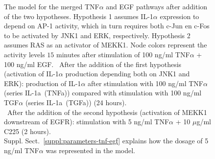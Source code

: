 \begin{figure}[!tpb]
\begin{center}
\end{center}
\caption{\scriptsize
{\bf \protect{}} The model for the merged TNF$\alpha$ and EGF pathways
after addition of the two hypotheses. 
Hypothesis 1 assumes IL-1$\alpha$ expression to depend on AP-1 activity, which in turn requires 
both c-Jun en c-Fos to be activated by JNK1 and ERK, respectively. Hypothesis 2 assumes RAS as an activator 
of MEKK1. Node colors represent the activity levels $15$ minutes
after stimulation of 100 ng/ml TNF$\alpha$ + 100 ng/ml EGF.
{\bf \protect{}}~After the addition of the first hypothesis (activation of IL-1$\alpha$ production depending both
on JNK1 and ERK): production of IL-1$\alpha$ after stimulation with 100 ng/ml TNF$\alpha$ (series {\sf IL-1a~(TNFa)})
compared with stimulation with 100 ng/ml TGF$\alpha$ (series {\sf IL-1a~(TGFa)}) (24 hours).\\
{\bf \protect{}}~After the addition of the second hypothesis (activation of MEKK1 downstream of EGFR):
stimulation with 5 ng/ml TNF$\alpha$ + 10 $\mu$g/ml C225 (2 hours).\\
Suppl. Sect.~\ref{suppl:parameters-tnf-egf} explains how the dosage of 5 ng/ml TNF$\alpha$ was represented in the model.}\label{fig:large-model-graph}
\end{figure}


